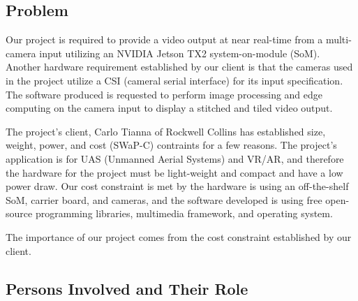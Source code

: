 \subsection{Problem}

Our project is required to provide a video output at near real-time from a 
multi-camera input utilizing an NVIDIA Jetson TX2 system-on-module (SoM).
Another hardware requirement established by our client is that the cameras used in
the project utilize a CSI (cameral serial interface) for its input specification.   
The software produced is requested to perform image processing and edge computing on the 
camera input to display a stitched and tiled video output. 

The project's client, Carlo Tianna of Rockwell Collins has established size, weight, 
power, and cost (SWaP-C) contraints for a few reasons. 
The project's application is for UAS (Unmanned Aerial Systems) and VR/AR, and therefore 
the hardware for the project must be light-weight and compact and have a low power 
draw. Our cost constraint is met by the hardware is using an off-the-shelf SoM, 
carrier board, and cameras, and the software developed is using free open-source 
programming libraries, multimedia framework, and operating system. 

The importance of our project comes from the cost constraint established by our client. 



\subsection{Persons Involved and Their Role}


